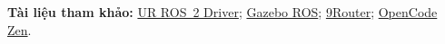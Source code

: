 \documentclass[11pt,a4paper]{article}
\begin{document}
{\footnotesize\textbf{Tài liệu tham khảo:}
\href{https://github.com/UniversalRobots/Universal_Robots_ROS2_Driver}{UR ROS~2 Driver};
\href{https://github.com/ros-simulation/gazebo_ros_pkgs}{Gazebo ROS};
\href{https://github.com/decolua/9router}{9Router};
\href{https://opencode.ai/docs/en/zen/}{OpenCode Zen}.}
\end{document}
